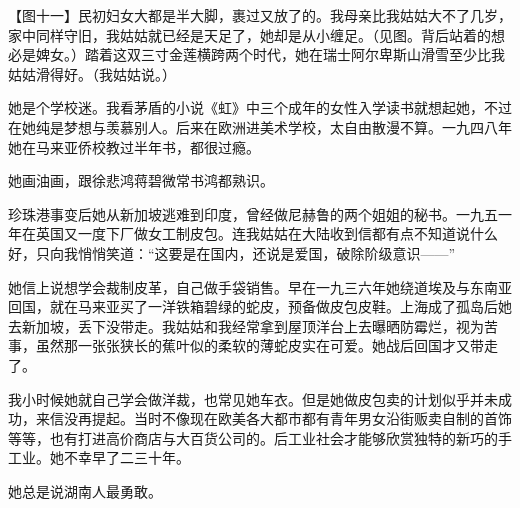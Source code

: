 \clearpage
\par 【图十一】民初妇女大都是半大脚，裹过又放了的。我母亲比我姑姑大不了几岁，家中同样守旧，我姑姑就已经是天足了，她却是从小缠足。（见图。背后站着的想必是婢女。）踏着这双三寸金莲横跨两个时代，她在瑞士阿尔卑斯山滑雪至少比我姑姑滑得好。（我姑姑说。）
\par 她是个学校迷。我看茅盾的小说《虹》中三个成年的女性入学读书就想起她，不过在她纯是梦想与羡慕别人。后来在欧洲进美术学校，太自由散漫不算。一九四八年她在马来亚侨校教过半年书，都很过瘾。
\par 她画油画，跟徐悲鸿蒋碧微常书鸿都熟识。
\par 珍珠港事变后她从新加坡逃难到印度，曾经做尼赫鲁的两个姐姐的秘书。一九五一年在英国又一度下厂做女工制皮包。连我姑姑在大陆收到信都有点不知道说什么好，只向我悄悄笑道：“这要是在国内，还说是爱国，破除阶级意识——”
\par 她信上说想学会裁制皮革，自己做手袋销售。早在一九三六年她绕道埃及与东南亚回国，就在马来亚买了一洋铁箱碧绿的蛇皮，预备做皮包皮鞋。上海成了孤岛后她去新加坡，丢下没带走。我姑姑和我经常拿到屋顶洋台上去曝晒防霉烂，视为苦事，虽然那一张张狭长的蕉叶似的柔软的薄蛇皮实在可爱。她战后回国才又带走了。
\par 我小时候她就自己学会做洋裁，也常见她车衣。但是她做皮包卖的计划似乎并未成功，来信没再提起。当时不像现在欧美各大都市都有青年男女沿街贩卖自制的首饰等等，也有打进高价商店与大百货公司的。后工业社会才能够欣赏独特的新巧的手工业。她不幸早了二三十年。
\par 她总是说湖南人最勇敢。
